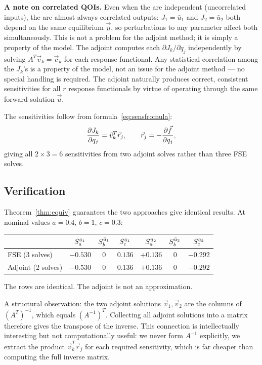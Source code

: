 \medskip\noindent
\textbf{A note on correlated QOIs.}
Even when the \POIs are independent (uncorrelated inputs),
the \QOIs are almost always correlated outputs:
$J_1 = \bar{u}_1$ and $J_2 = \bar{u}_2$ both depend on the same
equilibrium $\vec{\bar{u}}$, so perturbations to any parameter
affect both simultaneously.
This is not a problem for the adjoint method; it is simply a property
of the model.
The adjoint computes each $\partial J_k / \partial q_j$ independently
by solving $A^T\vec{v}_k = \vec{c}_k$ for each response functional.
Any statistical correlation among the $J_k$'s is a property of the model,
not an issue for the adjoint method --- no special handling is required.
The adjoint naturally produces correct, consistent sensitivities
for all $r$ response functionals by virtue of operating through
the same forward solution $\vec{\bar{u}}$.

The sensitivities follow from formula~\eqref{eq:sensfromula}:
\begin{equation}
  \frac{\partial J_k}{\partial q_j} = \vec{v}_k^T\vec{r}_j,
  \qquad
  \vec{r}_j = -\frac{\partial \vec{f}}{\partial q_j},
  \label{eq:sympSens}
\end{equation}
giving all $2 \times 3 = 6$ sensitivities from two adjoint solves
rather than three FSE solves.

\subsection{Verification}

Theorem~\ref{thm:equiv} guarantees the two approaches give identical
results. At nominal values $a = 0.4$, $b = 1$, $c = 0.3$:
\begin{center}
\renewcommand{\arraystretch}{1.3}
\begin{tabular}{lcccccc}
\toprule
 & $S_{a}^{\bar{u}_1}$ & $S_{b}^{\bar{u}_1}$ & $S_{c}^{\bar{u}_1}$
 & $S_{a}^{\bar{u}_2}$ & $S_{b}^{\bar{u}_2}$ & $S_{c}^{\bar{u}_2}$ \\
\midrule
FSE (3 solves)    & $-0.530$ & $0$ & $0.136$ & $+0.136$ & $0$ & $-0.292$ \\
Adjoint (2 solves)& $-0.530$ & $0$ & $0.136$ & $+0.136$ & $0$ & $-0.292$ \\
\bottomrule
\end{tabular}
\end{center}

The rows are identical. The adjoint is not an approximation.

\medskip

A structural observation: the two adjoint solutions
$\vec{v}_1, \vec{v}_2$ are the columns of $(A^T)^{-1}$,
which equals $(A^{-1})^T$. Collecting all adjoint solutions
into a matrix therefore gives the transpose of the inverse.
This connection is intellectually interesting but not computationally useful:
we never form $A^{-1}$ explicitly, we extract the product
$\vec{v}_k^T\vec{r}_j$ for each required sensitivity, which is
far cheaper than computing the full inverse matrix.


